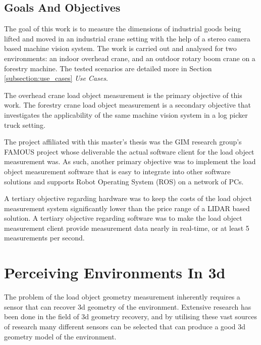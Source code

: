 \documentclass[12pt,a4paper,oneside,pdftex]{report}
\begin{document}
\section{Goals And Objectives}
\label{section:goals_and_objectives}

The goal of this work is to measure the dimensions of industrial goods being lifted and moved in an industrial crane setting with the help of a stereo camera based machine vision system. The work is carried out and analysed for two environments: an indoor overhead crane, and an outdoor rotary boom crane on a forestry machine. The tested scenarios are detailed more in Section \ref{subsection:use_cases} \emph{Use Cases}.

The overhead crane load object measurement is the primary objective of this work. The forestry crane load object measurement is a secondary objective that investigates the applicability of the same machine vision system in a log picker truck setting.

The project affiliated with this master's thesis was the GIM research group's FAMOUS project whose deliverable the actual software client for the load object measurement was. As such, another primary objective was to implement the load object measurement software that is easy to integrate into other software solutions and supports Robot Operating System (ROS) on a network of PCs.

A tertiary objective regarding hardware was to keep the costs of the load object measurement system significantly lower than the price range of a LIDAR based solution. A tertiary objective regarding software was to make the load object measurement client provide measurement data nearly in real-time, or at least 5 measurements per second.

\chapter{Perceiving Environments In 3d}
\label{chapter:perceiving_environments_in_3d}

The problem of the load object geometry measurement inherently requires a sensor that can recover 3d geometry of the environment. Extensive research has been done in the field of 3d geometry recovery, and by utilising these vast sources of research many different sensors can be selected that can produce a good 3d geometry model of the environment.
\end{document}
